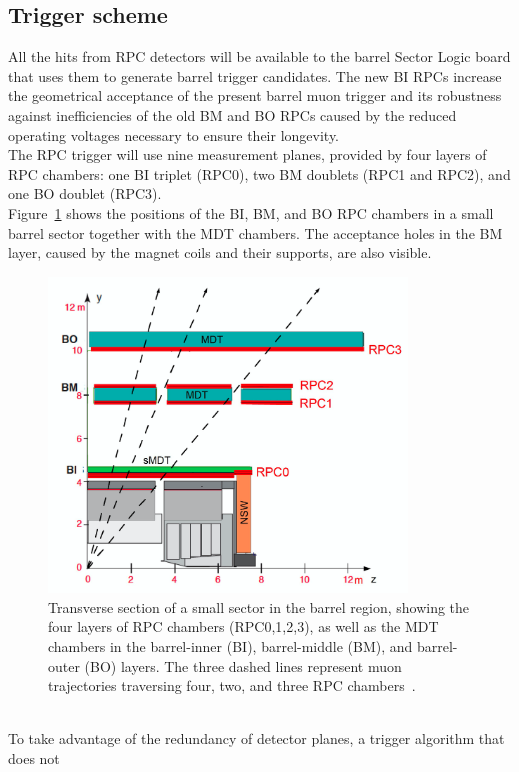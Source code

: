 \subsection {Trigger scheme}
\label{sec:trigScheme}
All the hits from RPC detectors will be available to the barrel Sector Logic board that uses them to
generate barrel trigger candidates. The new BI RPCs increase the geometrical acceptance
of the present barrel muon trigger and its robustness against inefficiencies of the old BM
and BO RPCs caused by the reduced operating voltages necessary to ensure their longevity.\\
The RPC trigger will use nine measurement planes, provided by four layers of RPC chambers:
one BI triplet (RPC0), two BM doublets (RPC1 and RPC2), and one BO doublet (RPC3).\\
Figure~\ref{fig:trig_schemeXY} shows the positions of the BI, BM, and BO RPC chambers in a small 
barrel sector
together with the MDT chambers. 
The acceptance holes in the BM layer, caused by the
magnet coils and their supports, are also visible.
\begin{figure}[!h]
	\centering
	\includegraphics[width=0.85\textwidth]{Chapters/CH3/figures/trig_schemeXY_paint}
	\caption{Transverse section of a small sector in the barrel region, showing the four layers of RPC chambers (RPC0,1,2,3), as well as the MDT chambers in the barrel-inner (BI), barrel-middle (BM), and barrel-outer (BO) layers. The three dashed lines represent muon trajectories traversing four, two, and three RPC chambers~\cite{TDR}.}
	\label{fig:trig_schemeXY}
\end{figure}
\\To take advantage of the redundancy of detector planes, a trigger algorithm that does not
